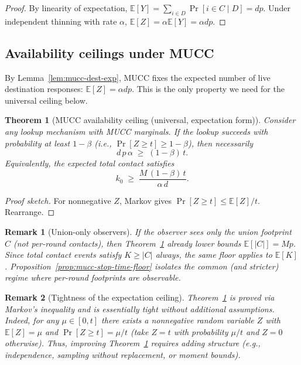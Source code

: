 \documentclass[11pt]{article}
\newtheorem{theorem}{Theorem}
\newtheorem{remark}{Remark}
\newcommand{\E}{\mathbb{E}}
\begin{document}
\begin{proof}
By linearity of expectation, $\E[Y]=\sum_{i\in D}\Pr[i\in C\mid D]=dp$.
Under independent thinning with rate $\alpha$, $\E[Z]=\alpha\E[Y]=\alpha dp$.
\end{proof}

\subsection{Availability ceilings under MUCC}
By Lemma~\ref{lem:mucc-dest-exp}, MUCC fixes the expected number of live destination responses: $\E[Z]=\alpha dp$.
This is the only property we need for the universal ceiling below.

\begin{theorem}[MUCC availability ceiling (universal, expectation form)]
\label{thm:mucc-ceiling}
Consider any lookup mechanism with MUCC marginals.
If the lookup succeeds with probability at least $1-\beta$ (i.e., $\Pr[Z\ge t]\ge 1-\beta$), then necessarily
\[
 d\,p\,\alpha \;\ge\; (1-\beta)\,t.
\]
Equivalently, the expected total contact satisfies
\[
 k_0 \;\ge\; \frac{M\,(1-\beta)\,t}{\alpha\,d}.
\]
\end{theorem}

\begin{proof}[Proof sketch]
For nonnegative $Z$, Markov gives $\Pr[Z\ge t]\le \E[Z]/t$.
Rearrange.
\end{proof}

\begin{remark}[Union-only observers]
If the observer sees only the union footprint $C$ (not per-round contacts), then Theorem~\ref{thm:mucc-ceiling} already lower bounds $\E[|C|]=Mp$.
Since total contact events satisfy $K\ge |C|$ always, the same floor applies to $\E[K]$.
Proposition~\ref{prop:mucc-stop-time-floor} isolates the common (and stricter) regime where per-round footprints are observable.
\end{remark}

\begin{remark}[Tightness of the expectation ceiling]
Theorem~\ref{thm:mucc-ceiling} is proved via Markov's inequality and is essentially tight without additional assumptions.
Indeed, for any $\mu\in[0,t]$ there exists a nonnegative random variable $Z$ with $\E[Z]=\mu$ and $\Pr[Z\ge t]=\mu/t$ (take $Z=t$ with probability $\mu/t$ and $Z=0$ otherwise).
Thus, improving Theorem~\ref{thm:mucc-ceiling} requires adding structure (e.g., independence, sampling without replacement, or moment bounds).
\end{remark}
\end{document}
